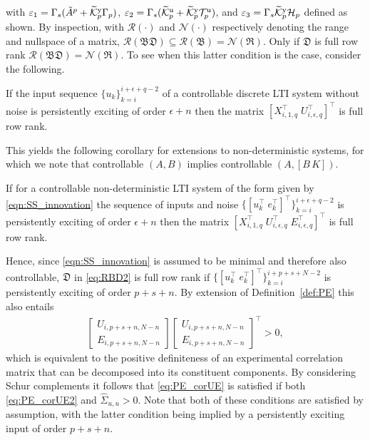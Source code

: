 with $\varepsilon_1=\Gamma_s(\tilde{A}^p+\widetilde{\mathcal{K}}_{p}^{\mathrm{{y}}}\Gamma_p)$, $\varepsilon_2=\Gamma_s(\widetilde{\mathcal{K}}_{p}^{\mathrm{{u}}}+\widetilde{\mathcal{K}}_{p}^{\mathrm{{y}}}\mathcal{T}_p^\mathrm{u})$, and $\varepsilon_3=\Gamma_s\widetilde{\mathcal{K}}_{p}^{\mathrm{{y}}}\mathcal{H}_p$ defined as shown. By inspection, with $\mathcal{R}(\cdot)$ and $\mathcal{N}(\cdot)$ respectively denoting the range and nullspace of a matrix, $\mathcal{R}(\mathfrak{B}\mathfrak{D})\subseteq\mathcal{R}(\mathfrak{B})=\mathcal{N}(\mathfrak{R})$. Only if $\mathfrak{D}$ is full row rank $\mathcal{R}(\mathfrak{B}\mathfrak{D})=\mathcal{N}(\mathfrak{R})$. To see when this latter condition is the case, consider the following.
\setcounter{thm}{0}
\begin{lem}
    If the input sequence $\{u_k\}_{k=i}^{i+\epsilon+q-2}$ of a controllable discrete \ac{LTI} system without noise is persistently exciting of order $\epsilon+n$ then the matrix $\left[X_{i,1,q}^\top\;U_{i,\epsilon,q}^\top\right]^\top$ is full row rank.
\end{lem}
This yields the following corollary for extensions to non-deterministic systems, for which we note that controllable $(A,B)$ implies controllable $(A,[B\,K])$.
\setcounter{thm}{0}
\begin{cor}
    If for a controllable non-deterministic \ac{LTI} system of the form given by \eqref{eqn:SS_innovation} the sequence of inputs and noise $\{[u_k^\top\;e_k^\top]^\top\}_{k=i}^{i+\epsilon+q-2}$ is persistently exciting of order $\epsilon+n$ then the matrix $\left[X_{i,1,q}^\top\;U_{i,\epsilon,q}^\top\;E_{i,\epsilon,q}^\top\right]^\top$ is full row rank.
\end{cor}
Hence, since \eqref{eqn:SS_innovation} is assumed to be minimal and therefore also controllable, $\mathfrak{D}$ in \eqref{eq:RBD2} is full row rank if $\{[u_k^\top\;e_k^\top]^\top\}_{k=i}^{i+p+s+N-2}$ is persistently exciting of order $p+s+n$. By extension of Definition~\ref{def:PE} this also entails
\begin{align}\label{eq:PE_corUE}
    \begin{bmatrix}
        U_{i,p+s+n,N-n}\\
        E_{i,p+s+n,N-n}
    \end{bmatrix}
    \begin{bmatrix}
        U_{i,p+s+n,N-n}\\
        E_{i,p+s+n,N-n}
    \end{bmatrix}^\top > 0,
\end{align}
which is equivalent to the positive definiteness of an experimental correlation matrix that can be decomposed into its constituent components. By considering Schur complements it follows that \eqref{eq:PE_corUE} is satisfied if both \eqref{eq:PE_corUE2} and $\widehat{\Sigma}_{u,u} > 0$. Note that both of these conditions are satisfied by assumption, with the latter condition being implied by a persistently exciting input of order $p+s+n$. %

